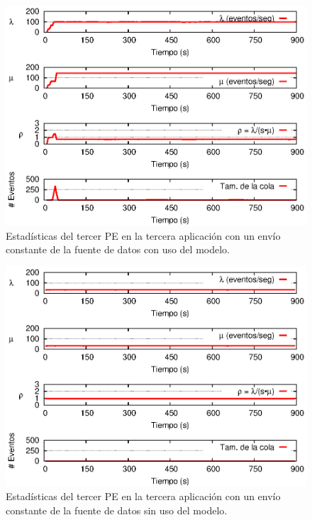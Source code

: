 \begin{figure}[!htp]
\centering
    \includegraphics[scale=1]{images/exp/app3/cm/logical/statusThreePE.eps}
    \caption{Estad\'isticas del tercer PE en la tercera aplicaci\'on con un env\'io constante de la fuente de datos con uso del modelo.}
    \label{fig:app3-statusThreePE-cm}
\end{figure}

\begin{figure}[!htp]
\centering
    \includegraphics[scale=1]{images/exp/app3/sm/logical/statusThreePE.eps}
    \caption{Estad\'isticas del tercer PE en la tercera aplicaci\'on con un env\'io constante de la fuente de datos sin uso del modelo.}
    \label{fig:app3-statusThreePE-sm}
\end{figure}